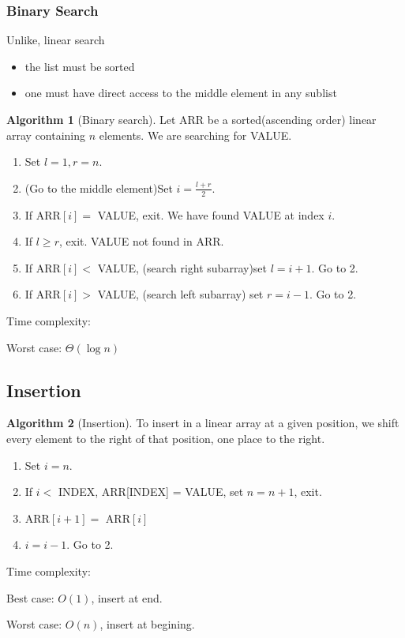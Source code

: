 \documentclass[10pt, a4paper]{extarticle}
\theoremstyle{definition}
\newtheorem{alg}{Algorithm}
\begin{document}
	\subsubsection{Binary Search}
		Unlike, linear search
		\begin{itemize}
			\item the list must be sorted
			\item one must have direct access to the middle element in any sublist
			\end{itemize}
	\begin{alg}[Binary search]
		Let ARR be a sorted(ascending order) linear array containing $n$ elements. We are searching for VALUE.
		\begin{enumerate}
			\item Set $l=1,r=n$.
			\item (Go to the middle element)Set $i=\frac{l+r}{2}$.
			\item If ARR$[i]=$ VALUE, exit. We have found VALUE at index $i$.
			\item If $l\geq r$, exit. VALUE not found in ARR.
			\item If ARR$[i]<$ VALUE, (search right subarray)set $l=i+1$. Go to 2.
			\item If ARR$[i]>$ VALUE, (search left subarray) set $r=i-1$. Go to 2.
	\end{enumerate}
		Time complexity:

		Worst case: $\Theta(\log n)$
		\hfill\\
		
	\end{alg}

		\subsection{Insertion}
	\begin{alg}[Insertion]
		To insert in a linear array at a given position, we shift every element to the right of that position, one place to the right.
		\begin{enumerate}
			\item Set $i=n$.
			\item If $i<$ INDEX, ARR[INDEX] = VALUE, set $n=n+1$, exit.
			\item ARR$[i+1]=$ ARR$[i]$
			\item $i=i-1$. Go to 2.
	\end{enumerate}
	Time complexity:

	Best case: $O(1)$, insert at end.

	Worst case: $O(n)$, insert at begining.
	\end{alg}
\end{document}
